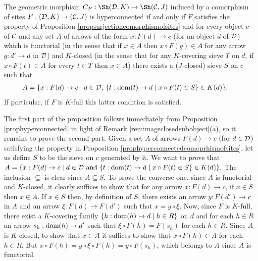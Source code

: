\documentclass[a4paper,12pt]{article}
\begin{document}
\begin{proposition}\label{prophyperconnectedcomoprhismofsites}
	The geometric morphism $C_{F}:\Sh({\cal D}, K)\to \Sh({\cal C}, J)$ induced by a comorphism of sites $F:({\cal D}, K)\to ({\cal C}, J)$ is hyperconnected if and only if $F$ satisfies the property of Proposition \ref{propsurjectioncomorphismofsites} and for every object $c$ of $\cal C$ and any set $A$ of arrows of the form $x:F(d)\to c$ (for an object $d$ of $\cal D$) which is functorial (in the sense that if $x\in A$ then $x\circ F(g)\in A$ for any arrow $g:d'\to d$ in $\cal D$) and $K$-closed (in the sense that for any $K$-covering sieve $T$ on $d$, if $x\circ F(t)\in A$ for every $t\in T$ then $x\in A$) there exists a ($J$-closed) sieve $S$ on $c$ such that 	
	\begin{equation*}\begin{split}
	A &= \{x:F(d)\to c \mid d\in {\cal D}\textup{, } \{t:\textup{dom}(t)\to d \mid x\circ F(t)\in S\}\in K(d)\}. 
	\end{split}\end{equation*}
	If particular, if $F$ is $K$-full this latter condition is satisfied.
\end{proposition} 

\begin{proofs}
The first part of the proposition follows immediately from Proposition \ref{prophyperconnected} in light of Remark \ref{remimageclosedsubobject}(a), so it remains to prove the second part. Given a set $A$ of arrows $F(d)\to c$ (for $d\in {\cal D}$) satisfying the property in Proposition \ref{prophyperconnectedcomoprhismofsites}, let us define $S$ to be the sieve on $c$ generated by it. We want to prove that $A= \{x:F(d)\to c \mid d\in {\cal D} \textup{ and } \{t:\textup{dom}(t)\to d \mid x\circ F(t)\in S\}\in K(d)\}.$ The inclusion $\subseteq$ is clear since $A\subseteq S$. To prove the converse one, since $A$ is functorial and $K$-closed, it clearly suffices to show that for any arrow $x:F(d)\to c$, if $x\in S$ then $x\in A$. If $x\in S$ then, by definition of $S$, there exists an arrow $y:F(d')\to c$ in $A$ and an arrow $\xi:F(d)\to F(d')$ such that $x=y\circ \xi$. Now, since $F$ is $K$-full, there exist a $K$-covering family $\{h:\textup{dom}(h)\to d \mid h\in R\}$ on $d$ and for each $h\in R$ an arrow $s_{h}:\textup{dom}(h)\to d'$ such that $\xi\circ F(h)=F(s_{h})$ for each $h\in R$. Since $A$ is $K$-closed, to show that $x\in A$ it suffices to show that $x\circ F(h)\in A$ for each $h\in R$. But $x\circ F(h)=y\circ \xi \circ F(h)=y\circ F(s_{h})$, which belongs to $A$ since $A$ is functorial.   
\end{proofs}
\end{document}
